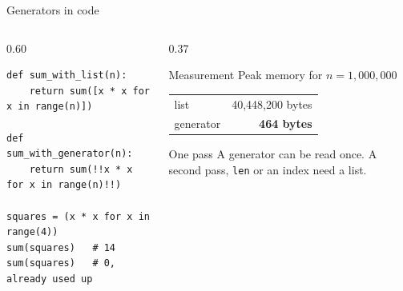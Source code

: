 \documentclass[aspectratio=169,11pt]{beamer}
\begin{document}
\begin{frame}[fragile]{Generators in code}
  \begin{columns}[T,onlytextwidth]
  \begin{column}{0.60\textwidth}
\begin{lstlisting}
def sum_with_list(n):
    return sum([x * x for x in range(n)])

def sum_with_generator(n):
    return sum(!!x * x for x in range(n)!!)

squares = (x * x for x in range(4))
sum(squares)   # 14
sum(squares)   # 0, already used up
\end{lstlisting}
  \end{column}
  \begin{column}{0.37\textwidth}
    \begin{block}{Measurement}
      Peak memory for $n = 1{,}000{,}000$\par\smallskip
      \begin{tabular}{@{}lr@{}}
        list & 40,448,200 bytes\\
        generator & \textbf{464 bytes}\\
      \end{tabular}
    \end{block}
    \begin{block}{One pass}
      A generator can be read once. A second pass, \texttt{len} or an index need a list.
    \end{block}
  \end{column}
  \end{columns}
\end{frame}
\end{document}
